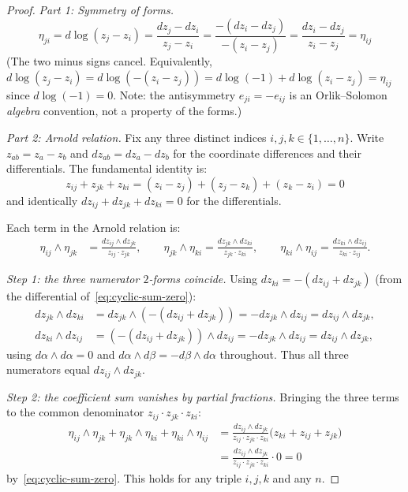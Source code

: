 \begin{proof}
\emph{Part 1: Symmetry of forms.}
\[\eta_{ji} = d\log(z_j - z_i) = \frac{dz_j - dz_i}{z_j - z_i} = \frac{-(dz_i - dz_j)}{-(z_i - z_j)} = \frac{dz_i - dz_j}{z_i - z_j} = \eta_{ij}\]
(The two minus signs cancel. Equivalently, $d\log(z_j-z_i) = d\log(-(z_i-z_j)) = d\log(-1) + d\log(z_i-z_j) = \eta_{ij}$ since $d\log(-1) = 0$. Note: the antisymmetry $e_{ji} = -e_{ij}$ is an Orlik--Solomon \emph{algebra} convention, not a property of the forms.)

\emph{Part 2: Arnold relation.}
Fix any three distinct indices $i,j,k \in \{1,\ldots,n\}$.  Write $z_{ab} = z_a - z_b$ and $dz_{ab} = dz_a - dz_b$ for the coordinate differences and their differentials.  The fundamental identity is:
\begin{equation}\label{eq:cyclic-sum-zero}
z_{ij} + z_{jk} + z_{ki} = (z_i - z_j) + (z_j - z_k) + (z_k - z_i) = 0
\end{equation}
and identically $dz_{ij} + dz_{jk} + dz_{ki} = 0$ for the differentials.

Each term in the Arnold relation is:
\begin{align*}
\eta_{ij} \wedge \eta_{jk} &= \frac{dz_{ij} \wedge dz_{jk}}{z_{ij} \cdot z_{jk}}, \qquad
\eta_{jk} \wedge \eta_{ki} = \frac{dz_{jk} \wedge dz_{ki}}{z_{jk} \cdot z_{ki}}, \qquad
\eta_{ki} \wedge \eta_{ij} = \frac{dz_{ki} \wedge dz_{ij}}{z_{ki} \cdot z_{ij}}.
\end{align*}

\emph{Step 1: the three numerator $2$-forms coincide.}  Using $dz_{ki} = -(dz_{ij} + dz_{jk})$ (from the differential of~\eqref{eq:cyclic-sum-zero}):
\begin{align*}
dz_{jk} \wedge dz_{ki} &= dz_{jk} \wedge (-(dz_{ij} + dz_{jk})) = -dz_{jk} \wedge dz_{ij} = dz_{ij} \wedge dz_{jk}, \\
dz_{ki} \wedge dz_{ij} &= (-(dz_{ij} + dz_{jk})) \wedge dz_{ij} = -dz_{jk} \wedge dz_{ij} = dz_{ij} \wedge dz_{jk},
\end{align*}
using $d\alpha \wedge d\alpha = 0$ and $d\alpha \wedge d\beta = -d\beta \wedge d\alpha$ throughout.  Thus all three numerators equal $dz_{ij} \wedge dz_{jk}$.

\emph{Step 2: the coefficient sum vanishes by partial fractions.}  Bringing the three terms to the common denominator $z_{ij} \cdot z_{jk} \cdot z_{ki}$:
\begin{align*}
\eta_{ij} \wedge \eta_{jk} + \eta_{jk} \wedge \eta_{ki} + \eta_{ki} \wedge \eta_{ij}
&= \frac{dz_{ij} \wedge dz_{jk}}{z_{ij} \cdot z_{jk} \cdot z_{ki}} \bigl(z_{ki} + z_{ij} + z_{jk}\bigr) \\
&= \frac{dz_{ij} \wedge dz_{jk}}{z_{ij} \cdot z_{jk} \cdot z_{ki}} \cdot 0 = 0
\end{align*}
by~\eqref{eq:cyclic-sum-zero}.  This holds for any triple $i,j,k$ and any $n$.


\end{proof}

